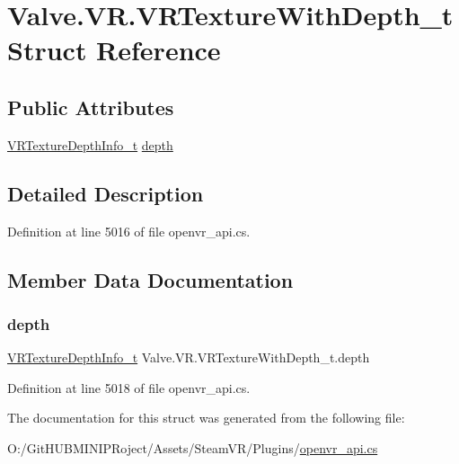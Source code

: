 \hypertarget{struct_valve_1_1_v_r_1_1_v_r_texture_with_depth__t}{}\section{Valve.\+V\+R.\+V\+R\+Texture\+With\+Depth\+\_\+t Struct Reference}
\label{struct_valve_1_1_v_r_1_1_v_r_texture_with_depth__t}
\subsection*{Public Attributes}
\begin{DoxyCompactItemize}
\item 
\mbox{\hyperlink{struct_valve_1_1_v_r_1_1_v_r_texture_depth_info__t}{V\+R\+Texture\+Depth\+Info\+\_\+t}} \mbox{\hyperlink{struct_valve_1_1_v_r_1_1_v_r_texture_with_depth__t_a1458b0d4242193f54a442267238e29f0}{depth}}
\end{DoxyCompactItemize}


\subsection{Detailed Description}


Definition at line 5016 of file openvr\+\_\+api.\+cs.



\subsection{Member Data Documentation}
\mbox{\label{struct_valve_1_1_v_r_1_1_v_r_texture_with_depth__t_a1458b0d4242193f54a442267238e29f0}} 
\subsubsection{\texorpdfstring{depth}{depth}}
{\footnotesize\ttfamily \mbox{\hyperlink{struct_valve_1_1_v_r_1_1_v_r_texture_depth_info__t}{V\+R\+Texture\+Depth\+Info\+\_\+t}} Valve.\+V\+R.\+V\+R\+Texture\+With\+Depth\+\_\+t.\+depth}



Definition at line 5018 of file openvr\+\_\+api.\+cs.



The documentation for this struct was generated from the following file\+:\begin{DoxyCompactItemize}
\item 
O\+:/\+Git\+H\+U\+B\+M\+I\+N\+I\+P\+Roject/\+Assets/\+Steam\+V\+R/\+Plugins/\mbox{\hyperlink{openvr__api_8cs}{openvr\+\_\+api.\+cs}}\end{DoxyCompactItemize}
